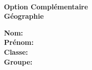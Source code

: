 ~
\vspace{3.5cm}
\begin{center}
	\bfseries\Huge Option Complémentaire\\ Géographie
	\vspace{3cm}
\end{center}
\vspace{7cm}

\renewcommand\ULthickness{1pt}\setlength\ULdepth{.5ex}\Large\bfseries
Nom:\tabto{3cm} \uline{\hfill}\\[.5cm]
Prénom:\tabto{3cm} \uline{\hfill}\\[.5cm]
Classe:\tabto{3cm} \uline{\hfill}\\[.5cm]
Groupe:\tabto{3cm} \uline{\hfill}\\[.5cm]

\renewcommand\ULthickness{.5pt}\setlength\ULdepth{.3ex}\normalfont

\clearpage
{}
\pagestyle{foot}